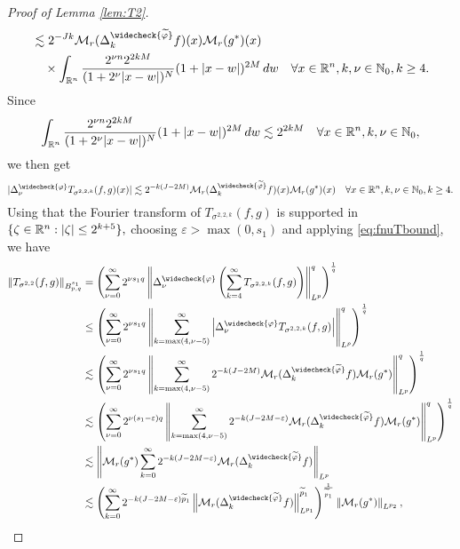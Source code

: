 \begin{proof}[Proof of Lemma \ref{lem:T2}]
\begin{align*}
&\lesssim 2^{-Jk} \mathcal{M}_r(\Delta^{\widecheck{\widetilde{\f}}}_k f)(x) \mathcal{M}_r(g^*)(x)\\
&\quad \times \int_{\rn}  \frac{2^{\nu n} 2^{2kM}}{(1+ 2^\nu |x- w|)^N}(1 +  |x-w|)^{2M} \, dw\quad \forall x\in\rn,k,\nu\in\na_0, k\ge 4.
\end{align*}
Since
\begin{align*}
\int_{{{\mathbb R}^n}}  \frac{2^{\nu n} 2^{2kM}}{(1+ 2^\nu |x- w|)^N}(1 +  |x-w|)^{2M} \, dw\lesssim 2^{2kM}\quad \forall x\in{{\mathbb R}^n}, k,\nu\in\mathbb{N}_0,
\end{align*}
we then get 
\begin{equation}\label{eq:fnuTbound}
|\Delta^{\widecheck{\f}}_\nu T_{\sigma^{2,2,k}}(f,g)(x)|\lesssim  2^{-k (J-2M)} \mathcal{M}_r(\Delta^{\widecheck{\widetilde{\f}}}_k f)(x) \mathcal{M}_r(g^*)(x)\quad \forall x\in\rn, k,\nu\in\na_0, k\ge 4.
\end{equation}
 Using that  the Fourier transform of  $T_{\sigma^{2,2,k}}(f,g)$ is supported in $\{\zeta \in {{\mathbb R}^n}: |\zeta| \leq 2^{k+5} \},$ choosing $\varepsilon>\max(0,s_1)$ and applying   \eqref{eq:fnuTbound},  we have
\begin{align*}
 \norm{T_{\sigma^{2,2}}(f,g)}{\ibes{p}{s_1}{q}} &=  \left(\sum\limits_{\nu =0}^\infty 2^{\nu s_1q}\norm{\Delta^{\widecheck{\f}}_\nu \left(\sum\limits_{k=4}^\infty T_{\sigma^{2,2,k}}(f,g)\right)}{L^p}^q \right)^\frac{1}{q}\\
&\le \left(\sum\limits_{\nu =0}^{\infty}  2^{\nu  s_1 q} \norm{\sum\limits_{k=\max(4,\nu -5)}^\infty \left| \Delta^{\widecheck{\f}}_\nu T_{\sigma^{2,2,k}}(f,g)\right|}{L^p}^q \right)^\frac{1}{q}\\
& \lesssim \left(\sum\limits_{\nu =0}^{\infty}  2^{\nu  s_1q} \norm{\sum\limits_{k=\max(4,\nu -5)}^\infty 2^{-k (J-2M)}  \mathcal{M}_r(\Delta^{\widecheck{\widetilde{\f}}}_k f) \mathcal{M}_r(g^*)}{L^p}^q \right)^\frac{1}{q}\\
& \lesssim \left(\sum\limits_{\nu =0}^{\infty}  2^{\nu  (s_1-\eps) q} \norm{\sum\limits_{k=\max(4,\nu -5)}^\infty 2^{-k (J-2M-\eps)}  \mathcal{M}_r(\Delta^{\widecheck{\widetilde{\f}}}_k f) \mathcal{M}_r(g^*)}{L^p}^q \right)^\frac{1}{q}\\
&\lesssim\norm{ \mathcal{M}_r(g^*) \sum\limits_{k=0}^\infty 2^{-k (J-2M-\eps)}  \mathcal{M}_r(\Delta^{\widecheck{\widetilde{\f}}}_k f) }{L^p}\\
&\lesssim \left(\sum\limits_{k=0}^\infty 2^{-k (J-2M-\eps)\widetilde{p}_1} \norm{\mathcal{M}_r(\Delta^{\widecheck{\widetilde{\f}}}_k f)}{L^{p_1}}^{\widetilde{p}_1} \right)^{\frac{1}{\widetilde{p}_1}}\norm{\mathcal{M}_r(g^*)}{L^{p_2}},

\end{align*}
\end{proof}
